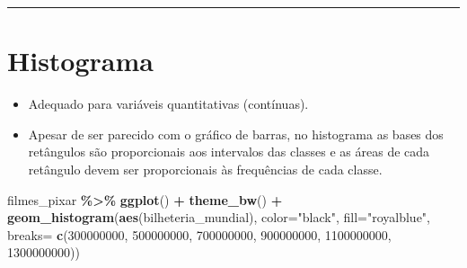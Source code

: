 \documentclass[
]{book}
\newenvironment{Shaded}{\begin{snugshade}}{\end{snugshade}}
\newcommand{\AttributeTok}[1]{\textcolor[rgb]{0.13,0.29,0.53}{#1}}
\newcommand{\DecValTok}[1]{\textcolor[rgb]{0.00,0.00,0.81}{#1}}
\newcommand{\FunctionTok}[1]{\textcolor[rgb]{0.13,0.29,0.53}{\textbf{#1}}}
\newcommand{\NormalTok}[1]{#1}
\newcommand{\SpecialCharTok}[1]{\textcolor[rgb]{0.81,0.36,0.00}{\textbf{#1}}}
\newcommand{\StringTok}[1]{\textcolor[rgb]{0.31,0.60,0.02}{#1}}
\providecommand{\tightlist}{%
  \setlength{\itemsep}{0pt}\setlength{\parskip}{0pt}}
\begin{document}
\begin{center}\rule{0.5\linewidth}{0.5pt}\end{center}

\section{Histograma}\label{histograma}

\begin{itemize}
\tightlist
\item
  Adequado para variáveis quantitativas (contínuas).\\
\item
  Apesar de ser parecido com o gráfico de barras, no histograma as bases dos retângulos são proporcionais aos intervalos das classes e as áreas de cada retângulo devem ser proporcionais às frequências de cada classe.
\end{itemize}

\begin{table}[!h]
\centering\begingroup\fontsize{8}{10}\selectfont

\endgroup{}
\end{table}

\begin{Shaded}
\begin{Highlighting}[]
\NormalTok{filmes\_pixar }\SpecialCharTok{\%\textgreater{}\%} \FunctionTok{ggplot}\NormalTok{() }\SpecialCharTok{+} \FunctionTok{theme\_bw}\NormalTok{() }\SpecialCharTok{+}
  \FunctionTok{geom\_histogram}\NormalTok{(}\FunctionTok{aes}\NormalTok{(bilheteria\_mundial), }\AttributeTok{color=}\StringTok{"black"}\NormalTok{, }\AttributeTok{fill=}\StringTok{"royalblue"}\NormalTok{, }
                 \AttributeTok{breaks=} \FunctionTok{c}\NormalTok{(}\DecValTok{300000000}\NormalTok{, }\DecValTok{500000000}\NormalTok{, }\DecValTok{700000000}\NormalTok{, }\DecValTok{900000000}\NormalTok{, }
                           \DecValTok{1100000000}\NormalTok{, }\DecValTok{1300000000}\NormalTok{))}
\end{Highlighting}
\end{Shaded}
\end{document}
